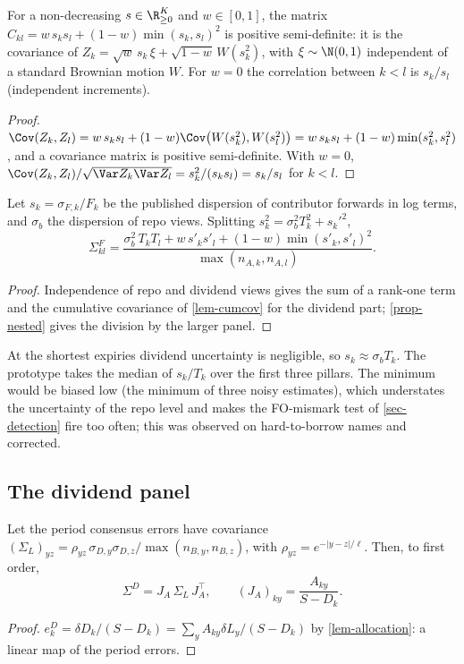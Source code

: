 \begin{lemma}\label{lem-cumcov}
For a non-decreasing $s\in\R^K_{\ge0}$ and $w\in[0,1]$, the matrix
$C_{kl}=w\,s_ks_l+(1-w)\min(s_k,s_l)^2$ is positive semi-definite: it is the covariance of
$Z_k=\sqrt{w}\,s_k\,\xi+\sqrt{1-w}\,W(s_k^2)$, with $\xi\sim\N(0,1)$ independent of a standard Brownian motion $W$.
For $w=0$ the correlation between $k<l$ is $s_k/s_l$ (independent increments).
\end{lemma}
\begin{proof}
$\Cov(Z_k,Z_l)=w\,s_ks_l+(1-w)\Cov\bigl(W(s_k^2),W(s_l^2)\bigr)=w\,s_ks_l+(1-w)\min(s_k^2,s_l^2)$, and a covariance
matrix is positive semi-definite. With $w=0$, $\Cov(Z_k,Z_l)/\sqrt{\Var Z_k\Var Z_l}=s_k^2/(s_ks_l)=s_k/s_l$ for $k<l$.
\end{proof}

\begin{proposition}\label{prop-sigmaF}
Let $s_k=\sigma_{F,k}/F_k$ be the published dispersion of contributor forwards in log terms, and
$\sigma_b$ the dispersion of repo views. Splitting $s_k^2=\sigma_b^2T_k^2+s_k'^2$,
\begin{equation}\label{eq-sigmaF}
\Sigma^F_{kl}=\frac{\sigma_b^2\,T_kT_l+w\,s'_ks'_l+(1-w)\min(s'_k,s'_l)^2}{\max(n_{A,k},n_{A,l})}.
\end{equation}
\end{proposition}
\begin{proof}
Independence of repo and dividend views gives the sum of a rank-one term and the cumulative covariance of
\cref{lem-cumcov} for the dividend part; \cref{prop-nested} gives the division by the larger panel.
\end{proof}

\begin{remark}
At the shortest expiries dividend uncertainty is negligible, so $s_k\approx\sigma_bT_k$. The prototype takes the
median of $s_k/T_k$ over the first three pillars. The minimum would be biased low (the minimum of three noisy
estimates), which understates the uncertainty of the repo level and makes the FO-mismark test of
\cref{sec-detection} fire too often; this was observed on hard-to-borrow names and corrected.
\end{remark}

\subsection{The dividend panel}
\begin{proposition}\label{prop-sigmaD}
Let the period consensus errors have covariance
$(\Sigma_L)_{yz}=\rho_{yz}\,\sigma_{D,y}\sigma_{D,z}/\max(n_{B,y},n_{B,z})$, with $\rho_{yz}=e^{-|y-z|/\ell}$. Then, to
first order,
\begin{equation}\label{eq-sigmaD}
\Sigma^D=J_A\,\Sigma_L\,J_A^\top,\qquad (J_A)_{ky}=\frac{A_{ky}}{S-D_k}.
\end{equation}
\end{proposition}
\begin{proof}
$e^D_k=\delta D_k/(S-D_k)=\sum_yA_{ky}\delta L_y/(S-D_k)$ by \cref{lem-allocation}: a linear map of the period errors.
\end{proof}

